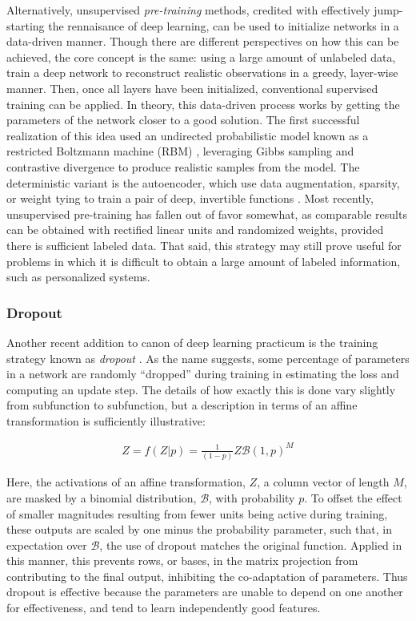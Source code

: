 Alternatively, unsupervised \emph{pre-training} methods, credited with effectively jump-starting the rennaisance of deep learning, can be used to initialize networks in a data-driven manner.
Though there are different perspectives on how this can be achieved, the core concept is the same:
using a large amount of unlabeled data, train a deep network to reconstruct realistic observations in a greedy, layer-wise manner.
Then, once all layers have been initialized, conventional supervised training can be applied.
In theory, this data-driven process works by getting the parameters of the network closer to a good solution.
The first successful realization of this idea used an undirected probabilistic model known as a restricted Boltzmann machine (RBM) \cite{Hinton2006}, leveraging Gibbs sampling and contrastive divergence to produce realistic samples from the model.
The deterministic variant is the autoencoder, which use data augmentation, sparsity, or weight tying to train a pair of deep, invertible functions \cite{Courville, Bengio, Vincent}.
Most recently, unsupervised pre-training has fallen out of favor somewhat, as comparable results can be obtained with rectified linear units and randomized weights, provided there is sufficient labeled data.
That said, this strategy may still prove useful for problems in which it is difficult to obtain a large amount of labeled information, such as personalized systems.


\subsubsection{Dropout}

Another recent addition to canon of deep learning practicum is the training strategy known as \emph{dropout} \cite{Hinton2012}.
As the name suggests, some percentage of parameters in a network are randomly ``dropped'' during training in estimating the loss and computing an update step.
The details of how exactly this is done vary slightly from subfunction to subfunction, but a description in terms of an affine transformation is sufficiently illustrative:

\begin{align*}
Z = f(Z | p) = \frac{1}{(1 - p)} Z \mathcal{B}(1, p)^M
\end{align*}

\noindent Here, the activations of an affine transformation, $Z$, a column vector of length $M$, are masked by a binomial distribution, $\mathcal{B}$, with probability $p$.
To offset the effect of smaller magnitudes resulting from fewer units being active during training, these outputs are scaled by one minus the probability parameter, such that, in expectation over $\mathcal{B}$, the use of dropout matches the original function.
Applied in this manner, this prevents rows, or bases, in the matrix projection from contributing to the final output, inhibiting the co-adaptation of parameters.
Thus dropout is effective because the parameters are unable to depend on one another for effectiveness, and tend to learn independently good features.

